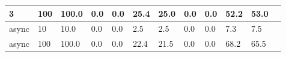 \documentclass[12pt,a4paper]{report}
\begin{document}
\begin{table}[h]
\begin{tabular}{|l|l|l|l|l|l|l|l|l|l|l|l|}
		3                        & 100                                & 100.0                           & 0.0                         & 0.0                       & 25.4                           & 25.0   & 0.0 & 0.0    & 52.2 & 53.0   \\ \hline
		async                    & 10                                 & 10.0                            & 0.0                         & 0.0                       & 2.5                            & 2.5    & 0.0 & 0.0    & 7.3  & 7.5    \\ \hline
		async                    & 100                                & 100.0                           & 0.0                         & 0.0                       & 22.4                           & 21.5   & 0.0 & 0.0    & 68.2 & 65.5   \\ \hline
	\end{tabular}
\end{table}
\end{document}
